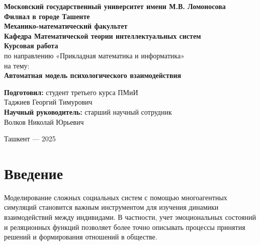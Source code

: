\documentclass[12pt]{article}
\begin{document}
\begin{titlepage}
    \centering
    \textbf{Московский государственный университет имени М.В. Ломоносова\\
    Филиал в городе Ташенте\\
    Механико-математический факультет\\
    Кафедра Математической теории интеллектуальных систем\\}
    \vfill
    \textbf{\Large{Курсовая работа}}\\
    \vspace{0.5cm}
    по направлению «Прикладная математика и информатика»\\
    на тему: \\
    \vspace{0.5cm}
    \textbf{\Large{Автоматная модель психологического взаимодействия}}\\
    \vfill
    \begin{flushright}
        \textbf{Подготовил:} студент третьего курса ПМиИ\\ Таджиев Георгий Тимурович\\
        \textbf{Научный руководитель:} старший научный сотрудник\\ Волков Николай Юрьевич\\
    \end{flushright}
    \vfill
    Ташкент — 2025
\end{titlepage}
\clearpage

\begin{abstract}
В данной работе рассматривается автоматная модель психологического взаимодействия между агентами, обладающими эмоциональными состояниями и реляционными функциями. Агенты способны принимать решения о взаимодействиях на основе комплексной оценки отношений и эмоциональных реакций. Реализация выполнена на Python с сохранением результатов в формат CSV для последующего анализа. Исследуется влияние эмоциональной чувствительности и динамики отношений на поведение агентов в обществе.
\end{abstract}

\tableofcontents
\clearpage

\section{Введение}

Моделирование сложных социальных систем с помощью многоагентных симуляций становится важным инструментом для изучения динамики взаимодействий между индивидами. В частности, учет эмоциональных состояний и реляционных функций позволяет более точно описывать процессы принятия решений и формирования отношений в обществе.
\end{document}
